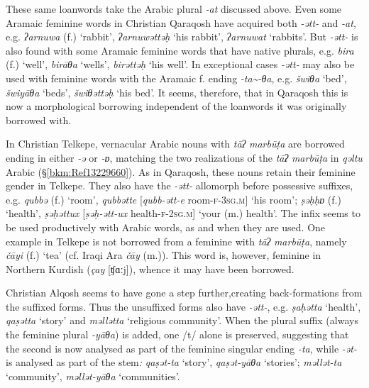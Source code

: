 \documentclass[output=paper]{langsci/langscibook}
\begin{document}
These same loanwords take the Arabic plural \textit{{}-at} discussed above. Even some Aramaic feminine words in Christian Qaraqosh have acquired both \textit{{}-ətt-} and \textit{\nobreakdash-at}, e.g. \textit{ʔarnuwa} (f.) ‘rabbit’, \textit{ʔarnuwəttəḥ} ‘his rabbit’, \textit{ʔarnuwat} ‘rabbits’. But \textit{{}-ətt-} is also found with some Aramaic feminine words that have native plurals, e.g. \textit{bira} (f.) ‘well’, \textit{birāθa} ‘wells’, \textit{birəttəḥ} ‘his well’. In exceptional cases \textit{{}-ətt-} may also be used with feminine words with the Aramaic f. ending \textit{{}-ta{\textasciitilde}-θa}, e.g. \textit{šwiθa} ‘bed’, \textit{šwiyāθa} ‘beds’, \textit{šwiθəttəḥ} ‘his bed’. It seems, therefore, that in Qaraqosh this is now a morphological borrowing independent of the loanwords it was originally borrowed with.

In Christian Telkepe, vernacular Arabic nouns with \textit{tāʔ} \textit{marbūṭa} are borrowed ending in either \textit{\nobreakdash-ə} or \textit{\nobreakdash-ɒ}, matching the two realizations of the \textit{tāʔ} \textit{marbūṭa} in \textit{qəltu} Arabic (§\ref{bkm:Ref13229660}). As in Qaraqosh, these nouns retain their feminine gender in Telkepe. They also have the \textit{\nobreakdash-ətt-} allomorph before possessive suffixes, e.g. \textit{qubbə} (f.) ‘room’, \textit{qubbətte} [\textit{qubb-ətt-e} room-\textsc{f-3sg.m}] ‘his room’; \textit{ṣəḥḥɒ} (f.) ‘health’,  \textit{ṣəḥəttux} [\textit{ṣəḥ-ətt-ux} health-\textsc{f-2sg.m}] ‘your (m.) health’. The infix seems to be used productively with Arabic words, as and when they are used. One example in Telkepe is not borrowed from a feminine with \textit{tāʔ} \textit{marbūṭa}, namely \textit{čāyi} (f.) ‘tea’ (cf. Iraqi Ara \textit{čāy} (m.)). This word is, however, feminine in Northern Kurdish (\textit{çay} [ʧɑːj]), whence it may have been borrowed.

Christian Alqosh seems to have gone a step further,creating back-formations from the suffixed forms. Thus the unsuffixed forms also have \textit{{}-ətt-}, e.g. \textit{ṣaḥətta} ‘health’, \textit{qaṣətta} ‘story’ and \textit{məllətta} ‘religious community’. When the plural suffix (always the feminine plural \textit{\nobreakdash-yāθa}) is added, one /t/ alone is preserved, suggesting that the second is now analysed as part of the feminine singular ending \textit{\nobreakdash-ta}, while \textit{\nobreakdash-ət\nobreakdash-} is analysed as part of the stem\textit{:} \textit{qaṣət\nobreakdash-ta} ‘story’, \textit{qaṣət\nobreakdash-yāθa} ‘stories’; \textit{məllət\nobreakdash-ta} ‘community’, \textit{məllət\nobreakdash-yāθa} ‘communities’.
\end{document}
